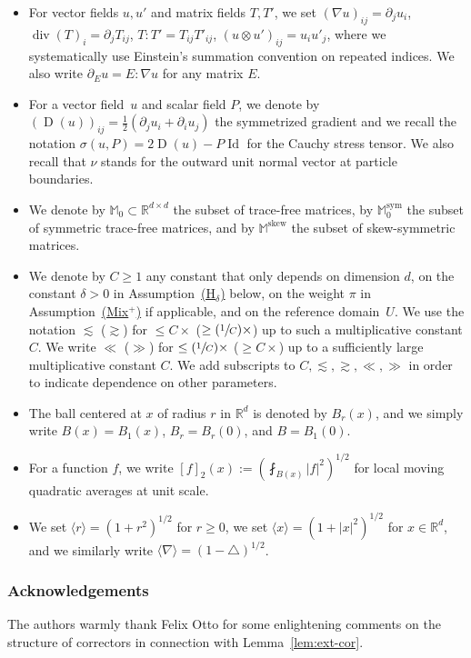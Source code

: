 \documentclass[10pt]{amsart}
\newcommand{\Hd}{\hyperref[Hd]{\textup{(H$_\delta$)}}\xspace}
\newcommand{\Mix}{\hyperref[Mix+]{\textup{(Mix$^+$)}}\xspace}
\newcommand{\Psfrac}[2]{(\sfrac{#1}{#2})}
\theoremstyle{plain}
\theoremstyle{definition}
\newcommand{\R}{\mathbb R}
\newcommand{\Md}{\mathbb M}
\newcommand{\Id}{\operatorname{Id}}
\newcommand{\D}{\operatorname{D}}
\newcommand{\Div}{{\operatorname{div}}}
\newcommand{\Sym}{{\operatorname{sym}}}
\newcommand{\Skew}{{\operatorname{skew}}}
\begin{document}
\begin{itemize}
\item For vector fields $u,u'$ and matrix fields $T,T'$, we set $(\nabla u)_{ij}=\partial_ju_i$, $\Div( T)_i=\partial_jT_{ij}$, $T\!\!:\!\!T'=T_{ij}T'_{ij}$, $(u\otimes u')_{ij}=u_iu'_j$, where we systematically use Einstein's summation convention on repeated indices. We also write {$\partial_Eu=E:\nabla u$} for any matrix $E$.
\item For a vector field~$u$ and scalar field $P$, we denote by $(\D(u))_{ij}=\frac12(\partial_ju_i+\partial_iu_j)$ the symmetrized gradient and we recall the notation $\sigma(u,P)=2\D(u)-P\Id$ for the Cauchy stress tensor. We also recall that $\nu$ stands for the outward unit normal vector at particle boundaries.
\item We denote by $\Md_0\subset\R^{d\times d}$ the subset of trace-free matrices, by $\Md_0^\Sym$ the subset of symmetric trace-free matrices, and by $\Md^\Skew$ the subset of skew-symmetric matrices.
\item We denote by $C\ge1$ any constant that only depends on dimension $d$, on the constant $\delta>0$ in Assumption~\Hd below, on the weight $\pi$ in Assumption~\Mix if applicable, and on the reference domain~$U$. We use the notation $\lesssim$ (\resp $\gtrsim$) for $\le C\times$ (\resp \mbox{$\ge\Psfrac1C\times$}) up to such a multiplicative constant $C$. We write $\ll$ (\resp $\gg$) for $\le \Psfrac1C\times$ (\resp \mbox{$\ge C\times$}) up to a sufficiently large multiplicative constant $C$.
We add subscripts to $C,\lesssim,\gtrsim,\ll,\gg$ in order to indicate dependence on other parameters.
\item The ball centered at $x$ of radius $r$ in $\R^d$ is denoted by $B_r(x)$, and we simply write $B(x)=B_1(x)$, $B_r=B_r(0)$, and $B=B_1(0)$.
\item For a function $f$, we write $[f]_2(x):=(\fint_{B(x)}|f|^2)^{1/2}$ for local moving quadratic averages at unit scale.
\item We set $\langle r \rangle =(1+r^2)^{1/2}$ for $r \ge 0$, we set $\langle x\rangle=(1+|x|^2)^{1/2}$ for $x\in\R^d$, and we similarly write $\langle\nabla\rangle=(1-\triangle)^{1/2}$.
\end{itemize}

\subsubsection*{Acknowledgements}
The authors warmly thank Felix Otto for some enlightening comments on the structure of correctors in connection with Lemma~\ref{lem:ext-cor}.
\end{document}
